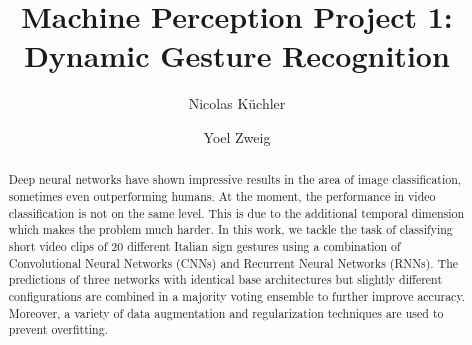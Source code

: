 \documentclass[sigconf]{acmart}
\begin{document}
\title{Machine Perception Project 1: \\ Dynamic Gesture Recognition}

\author{Nicolas K{\"u}chler}\affiliation{}

\author{Yoel Zweig}\affiliation{}

\begin{abstract}

Deep neural networks have shown impressive results in the area of image classification, sometimes even outperforming humans.
At the moment, the performance in video classification is not on the same level. This is due to the additional temporal dimension which makes the problem much harder.
In this work, we tackle the task of classifying short video clips of 20 different Italian sign gestures using a combination of Convolutional Neural Networks (CNNs) and Recurrent Neural Networks (RNNs). The predictions of three networks with identical base architectures but slightly different configurations are combined in a majority voting ensemble to further improve accuracy.
Moreover, a variety of data augmentation and regularization techniques are used to prevent overfitting. 


\end{abstract}

\maketitle





\end{document}
